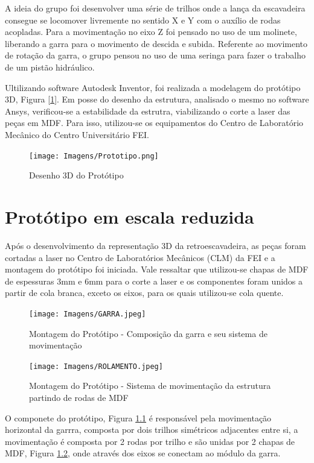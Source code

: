 \documentclass[deposito, acronym, symbols]{fei}
\begin{document}
A ideia do grupo foi desenvolver uma série de trilhos onde a lança da escavadeira consegue se locomover livremente no sentido X e Y com o auxílio de rodas acopladas. Para a movimentação no eixo Z foi pensado no uso de um molinete, liberando a garra para o movimento de descida e subida. Referente ao movimento de rotação da garra, o grupo pensou no uso de uma seringa para fazer o trabalho de um pistão hidráulico.


Ultilizando software Autodesk Inventor, foi realizada a modelagem do protótipo 3D, Figura [\ref{fig: Prototipo}]. Em posse do desenho da estrutura, analisado o mesmo no software Ansys, verificou-se a estabilidade da estrutra, viabilizando o corte a laser das peças em MDF. Para isso, utilizou-se os equipamentos do Centro de Laboratório Mecânico do Centro Universitário FEI.

 \begin{figure}[!htb]
 \centering
    \caption{Desenho 3D do Protótipo}
    \texttt{[image: Imagens/Prototipo.png]}
    \label{fig: Prototipo}
 \end{figure}

\chapter{Protótipo em escala reduzida}

Após o desenvolvimento da representação 3D da retroescavadeira, as peças foram cortadas a laser no Centro de Laboratórios Mecânicos (CLM) da FEI e a montagem do protótipo foi iniciada. Vale ressaltar que utilizou-se chapas de MDF de espessuras 3mm e 6mm para o corte a laser e os componentes foram unidos a partir de cola branca, exceto os eixos, para os quais utilizou-se cola quente.

  \begin{figure}[!htb]
 \centering
    \caption{Montagem do Protótipo - Composição da garra e seu sistema de movimentação}
    \texttt{[image: Imagens/GARRA.jpeg]}
    \label{fig: 2D-3_1}
 \end{figure}
 
  \begin{figure}[!htb]
 \centering
    \caption{Montagem do Protótipo - Sistema de movimentação da estrutura partindo de rodas de MDF}
    \texttt{[image: Imagens/ROLAMENTO.jpeg]}
    \label{fig: 2D_6_1}
 \end{figure}
 
O componete do protótipo, Figura \ref{fig: 2D-3_1} é responsável pela movimentação horizontal da garrra, composta por dois trilhos simétricos adjacentes entre si, a movimentação é composta por 2 rodas por trilho e são unidas por 2 chapas de MDF, Figura  \ref{fig: 2D_6_1}, onde através dos eixos se conectam ao módulo da garra.
\end{document}
